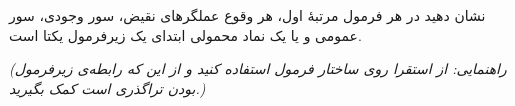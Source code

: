 نشان دهید در هر فرمول مرتبه‌ٔ اول، هر وقوع عملگرهای نقیض، سور وجودی، سور عمومی و یا یک نماد محمولی ابتدای یک زیرفرمول یکتا است.

\emph{(راهنمایی: از استقرا روی ساختار فرمول استفاده کنید و از این که رابطه‌ی زیرفرمول بودن تراگذری است کمک بگیرید.)}